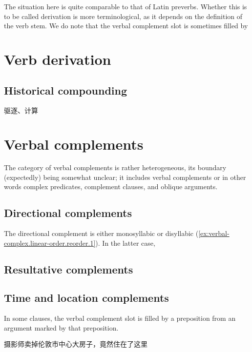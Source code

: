 \documentclass[UTF8, a4paper, oneside, scheme=plain, 12pt]{ctexrep}
\begin{document}
The situation here is quite comparable to that of Latin preverbs.
Whether this is to be called derivation is more terminological,
as it depends on the definition of the verb stem.
We do note that the verbal complement slot is sometimes filled by 


\section{Verb derivation}

\subsection{Historical compounding}\label{sec:verbal-complex.derivation.compound}

驱逐、计算


\section{Verbal complements}\label{sec:verbal-complex.complement}

The category of verbal complements is rather heterogeneous,
its boundary (expectedly) being somewhat unclear;
it includes verbal complements or in other words complex predicates, 
complement clauses, 
and oblique arguments. 

\subsection{Directional complements}\label{sec:verbal-complex.directional}

The directional complement is either monosyllabic or disyllabic
(\ref{ex:verbal-complex.linear-order.reorder.1}).
In the latter case, 

\subsection{Resultative complements}\label{sec:verbal-complex.resultative}

\subsection{Time and location complements}\label{sec:verbal-complex.prepositional}

In some clauses, the verbal complement slot is filled by a preposition
from an argument marked by that preposition.

\begin{exe}
    \ex 摄影师卖掉伦敦市中心大房子，竟然住在了这里
\end{exe}
\end{document}
